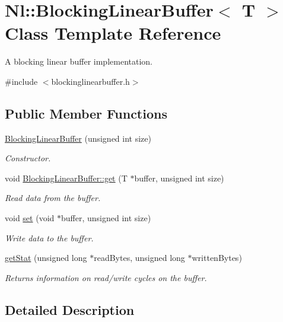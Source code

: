 \hypertarget{classNl_1_1BlockingLinearBuffer}{}\section{Nl\+:\+:Blocking\+Linear\+Buffer$<$ T $>$ Class Template Reference}
\label{classNl_1_1BlockingLinearBuffer}


A blocking linear buffer implementation.  




{\ttfamily \#include $<$blockinglinearbuffer.\+h$>$}

\subsection*{Public Member Functions}
\begin{DoxyCompactItemize}
\item 
\hyperlink{group__Audio_gae6f35f45439b194a69587bd9c124a736}{Blocking\+Linear\+Buffer} (unsigned int size)
\begin{DoxyCompactList}\small\item\em Constructor. \end{DoxyCompactList}\item 
void \hyperlink{group__Audio_ga7fd45f57444309f03fab9a13644d2240}{Blocking\+Linear\+Buffer\+::get} (T $\ast$buffer, unsigned int size)
\begin{DoxyCompactList}\small\item\em Read data from the buffer. \end{DoxyCompactList}\item 
void \hyperlink{group__Audio_gacd7c49cb333fc991edae3247d2fb34ef}{set} (void $\ast$buffer, unsigned int size)
\begin{DoxyCompactList}\small\item\em Write data to the buffer. \end{DoxyCompactList}\item 
\hyperlink{group__Audio_gabdd2b325cd5a2383579737299b4b3aca}{get\+Stat} (unsigned long $\ast$read\+Bytes, unsigned long $\ast$written\+Bytes)
\begin{DoxyCompactList}\small\item\em Returns information on read/write cycles on the buffer. \end{DoxyCompactList}\end{DoxyCompactItemize}


\subsection{Detailed Description}
